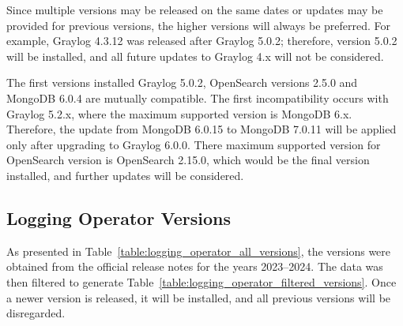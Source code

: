 \documentclass[../main.tex]{subfiles}
\begin{document}
Since multiple versions may be released on the same dates or updates may be provided for previous versions, the higher versions will always be preferred. For example, Graylog 4.3.12 was released after Graylog 5.0.2; therefore, version 5.0.2 will be installed, and all future updates to Graylog 4.x will not be considered.

The first versions installed Graylog 5.0.2, OpenSearch versions 2.5.0 and MongoDB 6.0.4 are mutually compatible. The first incompatibility occurs with Graylog 5.2.x, where the maximum supported version is MongoDB 6.x. Therefore, the update from MongoDB 6.0.15 to MongoDB 7.0.11 will be applied only after upgrading to Graylog 6.0.0.
There maximum supported version for OpenSearch version is OpenSearch 2.15.0, which would be the final version installed, and further updates will be considered.

\subsection{Logging Operator Versions}

As presented in Table~\ref{table:logging_operator_all_versions}, the versions were obtained from the official release notes for the years 2023–2024. The data was then filtered to generate Table~\ref{table:logging_operator_filtered_versions}. Once a newer version is released, it will be installed, and all previous versions will be disregarded.
\end{document}
